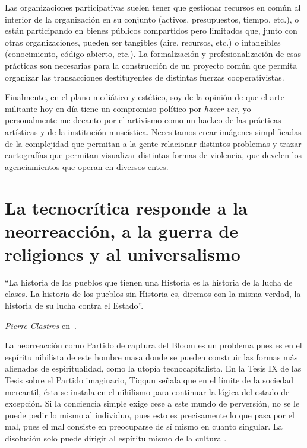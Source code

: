 Las organizaciones participativas suelen tener que gestionar recursos en común al interior de la organización en su conjunto (activos, presupuestos, tiempo, etc.), o están participando en bienes públicos compartidos pero limitados que, junto con otras organizaciones, pueden ser tangibles (aire, recursos, etc.) o intangibles (conocimiento, código abierto, etc.). La formalización y profesionalización de esas prácticas son necesarias para la construcción de un proyecto común que permita organizar las transacciones destituyentes de distintas fuerzas cooperativistas.

Finalmente, en el plano mediático y estético, soy de la opinión de que el arte militante hoy en día tiene un compromiso político por \emph{hacer ver}, yo personalmente me decanto por el artivismo como un hackeo de las prácticas artísticas y de la institución museística. Necesitamos crear imágenes simplificadas de la complejidad que permitan a la gente relacionar distintos problemas y trazar cartografías que permitan visualizar distintas formas de violencia, que develen los agenciamientos que operan en diversos entes.

\section{La tecnocrítica responde a la neorreacción, a la guerra de religiones y al universalismo}
\label{sec:la-tecnocrítica-responde}

\epigraph{\enquote{La historia de los pueblos que tienen una Historia es la historia de la lucha de clases. La historia de los pueblos sin Historia es, diremos con la misma verdad, la historia de su lucha contra el Estado}.}{\emph{Pierre Clastres} en~\autocite{clastresSociedadContraEstado2013}.}

La neorreacción como Partido de captura del Bloom es un problema pues es en el espíritu nihilista de este hombre masa donde se pueden construir las formas más alienadas de espiritualidad, como la utopía tecnocapitalista. En la Tesis IX de las Tesis sobre el Partido imaginario, Tiqqun señala que en el límite de la sociedad mercantil, ésta se instala en el nihilismo para continuar la lógica del estado de excepción. Si la conciencia simple exige cese a este mundo de perversión, no se le puede pedir lo mismo al individuo, pues esto es precisamente lo que pasa por el mal, pues el mal consiste en preocuparse de sí mismo en cuanto singular. La disolución solo puede dirigir al espíritu mismo de la cultura \autocite{tiqqunTesisSobrePartido}.

